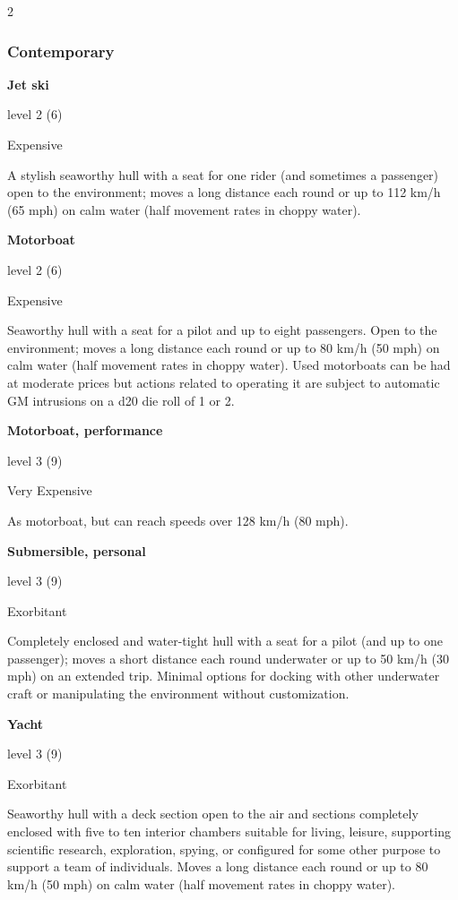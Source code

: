 \begin{multicols}{2}

\subsubsection{Contemporary}

\textbf{Jet ski}

level 2 (6) 

Expensive 

A stylish seaworthy hull with a seat for one rider (and sometimes a passenger) open to the environment; moves a long distance each round or up to 112 km/h (65 mph) on calm water (half movement rates in choppy water). 

\textbf{Motorboat} 

level 2 (6) 

Expensive 

Seaworthy hull with a seat for a pilot and up to eight passengers. Open to the environment; moves a long distance each round or up to 80 km/h (50 mph) on calm water (half movement rates in choppy water). Used motorboats can be had at moderate prices but actions related to operating it are subject to automatic GM intrusions on a d20 die roll of 1 or 2. 

\textbf{Motorboat, performance} 

level 3 (9) 

Very Expensive 

As motorboat, but can reach speeds over 128 km/h (80 mph). 

\textbf{Submersible, personal} 

level 3 (9) 

Exorbitant 

Completely enclosed and water-tight hull with a seat for a pilot (and up to one passenger); moves a short distance each round underwater or up to 50 km/h (30 mph) on an extended trip. Minimal options for docking with other underwater craft or manipulating the environment without customization. 

\textbf{Yacht} 

level 3 (9) 

Exorbitant 

Seaworthy hull with a deck section open to the air and sections completely enclosed with five to ten interior chambers suitable for living, leisure, supporting scientific research, exploration, spying, or configured for some other purpose to support a team of individuals. Moves a long distance each round or up to 80 km/h (50 mph) on calm water (half movement rates in choppy water). 


\end{multicols}
